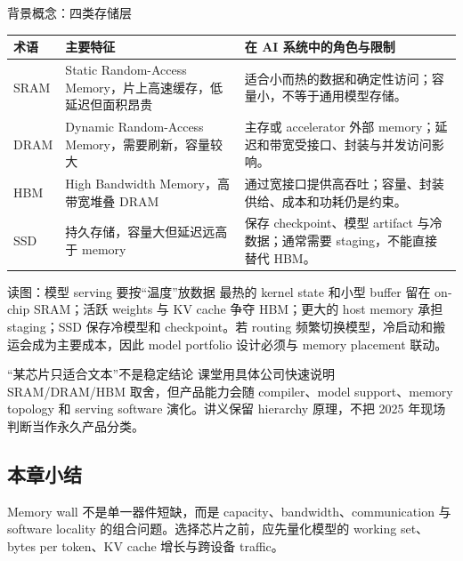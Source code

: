 \begin{knowledgebox}{背景概念：四类存储层}
\begin{tabularx}{\textwidth}{L{0.17\textwidth}L{0.24\textwidth}X}
\toprule
术语 & 主要特征 & 在 AI 系统中的角色与限制 \\
\midrule
SRAM & Static Random-Access Memory，片上高速缓存，低延迟但面积昂贵 & 适合小而热的数据和确定性访问；容量小，不等于通用模型存储。 \\
DRAM & Dynamic Random-Access Memory，需要刷新，容量较大 & 主存或 accelerator 外部 memory；延迟和带宽受接口、封装与并发访问影响。 \\
HBM & High Bandwidth Memory，高带宽堆叠 DRAM & 通过宽接口提供高吞吐；容量、封装供给、成本和功耗仍是约束。 \\
SSD & 持久存储，容量大但延迟远高于 memory & 保存 checkpoint、模型 artifact 与冷数据；通常需要 staging，不能直接替代 HBM。 \\
\bottomrule
\end{tabularx}
\end{knowledgebox}


\begin{knowledgebox}{读图：模型 serving 要按“温度”放数据}
最热的 kernel state 和小型 buffer 留在 on-chip SRAM；活跃 weights 与 KV cache 争夺 HBM；更大的 host memory 承担 staging；SSD 保存冷模型和 checkpoint。若 routing 频繁切换模型，冷启动和搬运会成为主要成本，因此 model portfolio 设计必须与 memory placement 联动。
\end{knowledgebox}

\begin{warningbox}{“某芯片只适合文本”不是稳定结论}
课堂用具体公司快速说明 SRAM/DRAM/HBM 取舍，但产品能力会随 compiler、model support、memory topology 和 serving software 演化。讲义保留 hierarchy 原理，不把 2025 年现场判断当作永久产品分类。
\end{warningbox}

\subsection{本章小结}

Memory wall 不是单一器件短缺，而是 capacity、bandwidth、communication 与 software locality 的组合问题。选择芯片之前，应先量化模型的 working set、bytes per token、KV cache 增长与跨设备 traffic。

